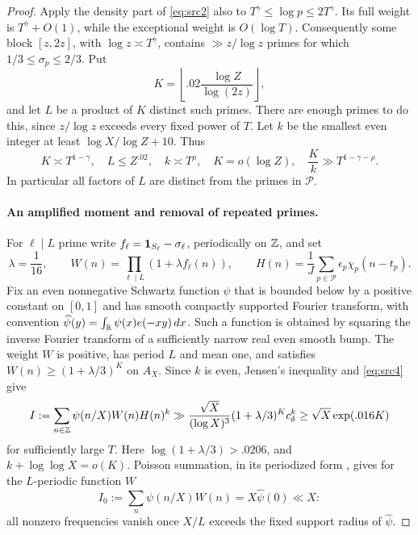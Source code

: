 \begin{proof}
Apply the density part of \eqref{eq:src2} also to
$T^\gamma\leq\log p\leq2T^\gamma$.  Its full weight is
$T^\gamma+O(1)$, while the exceptional weight is $O(\log T)$.
Consequently some block $[z,2z]$, with $\log z\asymp T^\gamma$,
contains $\gg z/\log z$ primes for which
$1/3\leq\sigma_p\leq2/3$.  Put
\[
 K=\left\lfloor .02\frac{\log Z}{\log(2z)}\right\rfloor,
\]
and let $L$ be a product of $K$ distinct such primes.  There are enough
primes to do this, since $z/\log z$ exceeds every fixed power of $T$.
Let $k$ be the smallest even integer at least
$\log X/\log Z+10$.  Thus
\begin{equation}\label{eq:quad-scales}
 K\asymp T^{1-\gamma},\quad L\leq Z^{.02},\quad
 k\asymp T^\rho,\quad K=o(\log Z),\quad
 \frac Kk\gg T^{1-\gamma-\rho}.
\end{equation}
In particular all factors of $L$ are distinct from the primes in
$\mathcal P$.

\paragraph{An amplified moment and removal of repeated primes.}
For $\ell\mid L$ prime write
$f_\ell=\mathbf 1_{S_\ell}-\sigma_\ell$, periodically on $\mathbb Z$, and set
\[
 \lambda=\frac1{16},\qquad
 W(n)=\prod_{\ell\mid L}(1+\lambda f_\ell(n)),\qquad
 H(n)=\frac1J\sum_{p\in\mathcal P}\epsilon_p\chi_p(n-t_p).
\]
Fix an even nonnegative Schwartz function $\psi$ that is bounded below
by a positive constant on $[0,1]$ and has smooth compactly supported
Fourier transform, with convention
$\widehat\psi(y)=\int_\mathbb R\psi(x)e(-xy)\,dx$.
Such a function is obtained by squaring the inverse Fourier transform
of a sufficiently narrow real even smooth bump.
The weight $W$ is positive, has period $L$ and mean one, and satisfies
$W(n)\geq(1+\lambda/3)^K$ on $A_X$.
Since $k$ is even, Jensen's inequality and \eqref{eq:src4} give
\begin{equation}\label{eq:quad-moment-lower}
 I:=\sum_{n\in\mathbb Z}\psi(n/X)W(n)H(n)^k
   \gg \frac{\sqrt X}{(\log X)^3}(1+\lambda/3)^Kc_\delta^k
   \geq\sqrt X\exp(.016K)
\end{equation}
for sufficiently large $T$.  Here
$\log(1+\lambda/3)>.0206$, and $k+\log\log X=o(K)$.
Poisson summation, in its periodized form
\cite[Appendix~D.2]{MontgomeryVaughan2007}, gives for the $L$-periodic
function $W$
\begin{equation}\label{eq:quad-total-weight}
 I_0:=\sum_n\psi(n/X)W(n)=X\widehat\psi(0)\ll X:
\end{equation}
all nonzero frequencies vanish once $X/L$ exceeds the fixed support
radius of $\widehat\psi$.


\end{proof}
